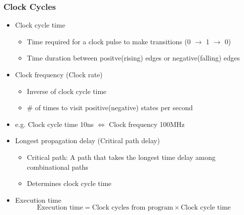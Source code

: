 \subsubsection*{Clock Cycles}
\begin{itemize}
    \item Clock cycle time
    \begin{itemize}
        \item Time required for a clock pulse to make transitions (0 $\rightarrow$ 1 $\rightarrow$ 0)
        \item Time duration between positve(rising) edges or negative(falling) edges
    \end{itemize}
    \item Clock frequency (Clock rate)
    \begin{itemize}
        \item Inverse of clock cycle time
        \item \# of times to visit positive(negative) states per second
    \end{itemize}
    \item e.g. Clock cycle time 10ns $\Leftrightarrow$ Clock frequency 100MHz
    \item Longest propagation delay (Critical path delay)
    \begin{itemize}
        \item Critical path: A path that takes the longest time delay among combinational paths
        \item Determines clock cycle time
    \end{itemize}
    \item Execution time
    \begin{equation}
        \text{Execution~time}=\text{Clock~cycles~from~program}\times\text{Clock~cycle~time}
    \end{equation}
\end{itemize}

